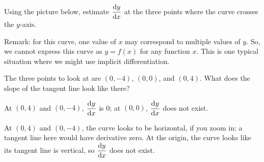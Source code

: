 \begin{Mquestion}
Using the picture below, estimate $\ds\diff{y}{x}$ at the three points where the curve crosses the $y$-axis.
\begin{center}
\end{center}
Remark: for this curve, one value of $x$ may correspond to multiple values of $y$. So, we cannot express this curve as $y=f(x)$ for any function $x$. This is one typical situation where we might use implicit differentiation.
\end{Mquestion}
\begin{hint}
The three points to look at are $(0,-4)$, $(0,0)$, and $(0,4)$. What does the slope of the tangent line look like there?
\end{hint}
\begin{answer}
At $(0,4)$ and $(0,-4)$, $\ds\diff{y}{x}$ is 0; at $(0,0)$, $\ds\diff{y}{x}$ does not exist.
\end{answer}
\begin{solution}
At $(0,4)$ and $(0,-4)$, the curve looks to be horizontal, if you zoom in: a tangent line here would have derivative zero. At the origin, the curve looks like its tangent line is vertical, so $\ds\diff{y}{x}$ does not exist.

\begin{center}
\end{center}
\end{solution}

